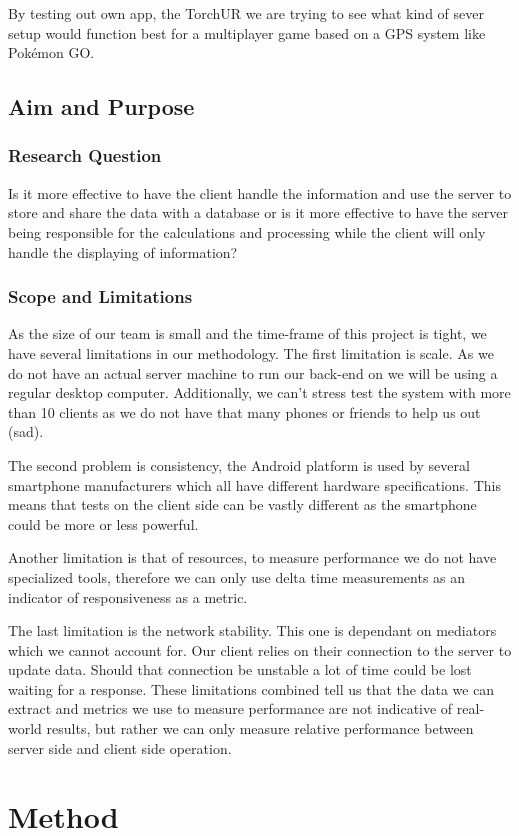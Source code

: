 \documentclass[12pt,a4paper,twoside]{report}
\begin{document}
By testing out own app, the TorchUR we are trying to see what kind of sever setup would function best for a multiplayer game based on a GPS system like Pokémon GO.

\newpage
\subsection{Aim and Purpose}
\subsubsection{Research Question}
Is it more effective to have the client handle the information and use the server to store and share the data with a database or is it more effective to have the server being responsible for the calculations and processing while the client will only handle the displaying of information?
\subsubsection{Scope and Limitations}
As the size of our team is small and the time-frame of this project is tight, we have several limitations in our methodology. The first limitation is scale. As we do not have an actual server machine to run our back-end on we will be using a regular desktop computer. Additionally, we can't stress test the system with more than 10 clients as we do not have that many phones or friends to help us out (sad).

The second problem is consistency, the Android platform is used by several smartphone manufacturers which all have different hardware specifications. This means that tests on the client side can be vastly different as the smartphone could be more or less powerful.

Another limitation is that of resources, to measure performance we do not have specialized tools, therefore we can only use delta time measurements as an indicator of responsiveness as a metric.

The last limitation is the network stability. This one is dependant on mediators which we cannot account for. Our client relies on their connection to the server to update data. Should that connection be unstable a lot of time could be lost waiting for a response. These limitations combined tell us that the data we can extract and metrics we use to measure performance are not indicative of real-world results, but rather we can only measure relative performance between server side and client side operation.
\newpage
\section{Method}
\end{document}
